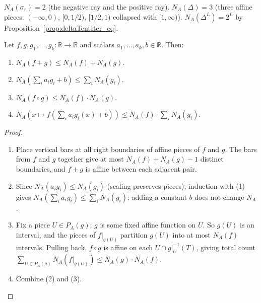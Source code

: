 \begin{remark}
  $N_A(\sigma_r) = 2$ (the negative ray and the positive ray).
  $N_A(\Delta) = 3$ (three affine pieces: $(-\infty,0)$, $[0,1/2)$, $[1/2,1)$ collapsed with $[1,\infty)$).
  $N_A(\Delta^L) = 2^L$ by Proposition~\ref{prop:deltaTentIter_eq}.
\end{remark}

\begin{lemma}\label{lem:combination_rules}
Let $f, g, g_1, \ldots, g_k : \mathbb{R} \to \mathbb{R}$ and scalars $a_1, \ldots, a_k, b \in \mathbb{R}$. Then:
\begin{enumerate}
  \item $N_A(f + g) \leq N_A(f) + N_A(g)$.
  \item $N_A\!\left(\sum_i a_i g_i + b\right) \leq \sum_i N_A(g_i)$.
  \item $N_A(f \circ g) \leq N_A(f) \cdot N_A(g)$.
  \item $N_A\!\left(x \mapsto f\!\left(\sum_i a_i g_i(x) + b\right)\right) \leq N_A(f) \cdot \sum_i N_A(g_i)$.
\end{enumerate}
\end{lemma}

\begin{proof}
  \begin{enumerate}
    \item Place vertical bars at all right boundaries of affine pieces of $f$ and $g$.
      The bars from $f$ and $g$ together give at most $N_A(f) + N_A(g) - 1$ distinct boundaries,
      and $f+g$ is affine between each adjacent pair.
    \item Since $N_A(a_i g_i) \leq N_A(g_i)$ (scaling preserves pieces), induction with (1) gives
      $N_A(\sum_i a_i g_i) \leq \sum_i N_A(g_i)$; adding a constant $b$ does not change $N_A$.
    \item Fix a piece $U \in P_A(g)$; $g$ is some fixed affine function on $U$.
      So $g(U)$ is an interval, and the pieces of $f|_{g(U)}$ partition $g(U)$ into at most $N_A(f)$ intervals.
      Pulling back, $f \circ g$ is affine on each $U \cap g|_U^{-1}(T)$, giving total count
      $\sum_{U \in P_A(g)} N_A(f|_{g(U)}) \leq N_A(g) \cdot N_A(f)$.
    \item Combine (2) and (3).
  \end{enumerate}
\end{proof}

